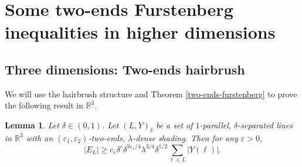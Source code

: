 \documentclass{amsart}
\numberwithin{equation}{section}
\newtheorem{lemma}[theorem]{Lemma}
\newcommand{\de}{\delta}
\newcommand{\e}{\varepsilon}
\newcommand{\la}{\lambda}
\newcommand{\ZR}{\mathbb{R}}
\begin{document}
\section{Some two-ends Furstenberg inequalities in higher dimensions} \label{section: twoends Kakeyand}


 
\subsection{Three dimensions: Two-ends hairbrush} We will use the hairbrush structure and Theorem \ref{two-ends-furstenberg} to prove the following result in $\ZR^3$.




\begin{lemma}
\label{two-ends-hairbrush-lem}
Let $\de\in(0,1)$.
Let $(L,Y)_\de$ be a set of $1$-parallel, $\de$-separated lines in $\ZR^3$ with an $(\e_1, \e_2)$-two-ends, $\la$-dense shading. Then for any $\e>0$,
\begin{equation}
    |E_L|\geq c_\e\de^\e \de^{3\e_1/4}\la^{3/4}\de^{1/2} \sum_{\ell\in L} |Y(\ell)|.
\end{equation}
\end{lemma}
\end{document}
